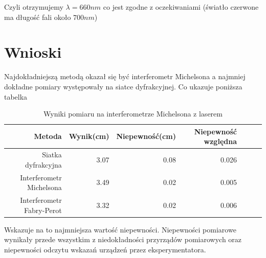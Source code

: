 \documentclass[a4paper]{article}
\begin{document}
Czyli otrzymujemy $\lambda = 660nm$ co jest zgodne z oczekiwaniami (światło czerwone ma długość fali około $700 nm$)


\section{Wnioski}
Najdokładniejszą metodą okazał się być interferometr Michelsona a najmniej dokładne pomiary występowały na siatce dyfrakcyjnej. Co ukazuje poniższa tabelka

\begin{table}[h!]
\centering
\begin{tabular}{rrrrrrr}
\toprule
Metoda & Wynik(cm) & Niepewność(cm) & Niepewność względna\\
\midrule
Siatka dyfrakcyjna & 3.07 & 0.08 & 0.026\\
Interferometr Michelsona & 3.49 & 0.02 & 0.005\\
Interferometr Fabry-Perot & 3.32 & 0.02 & 0.006\\
\bottomrule
\end{tabular}
\caption{Wyniki pomiaru na interferometrze Michelsona z laserem}
\label{porownanie_metod}
\end{table}

Wskazuje na to najmniejsza wartość niepewności. Niepewności pomiarowe wynikały przede
wszystkim z niedokładności przyrządów pomiarowych oraz niepewności odczytu wskazań urządzeń
przez eksperymentatora.
\end{document}
